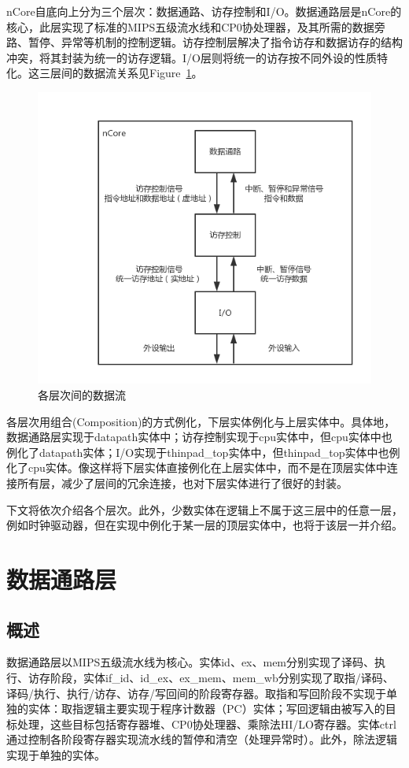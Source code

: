 \documentclass{article}
\begin{document}
\begin{spacing}{1.4}
nCore自底向上分为三个层次：数据通路、访存控制和I/O。数据通路层是nCore的核心，此层实现了标准的MIPS五级流水线和CP0协处理器，及其所需的数据旁路、暂停、异常等机制的控制逻辑。访存控制层解决了指令访存和数据访存的结构冲突，将其封装为统一的访存逻辑。I/O层则将统一的访存按不同外设的性质特化。这三层间的数据流关系见Figure~\ref{fig:layer-data-flow}。

\begin{figure}[!htb]
	\centering
	\includegraphics[width=.7\textwidth]{layer-data-flow.png}
	\caption{各层次间的数据流}
    \label{fig:layer-data-flow}
\end{figure}

各层次用组合(Composition)的方式例化，下层实体例化与上层实体中。具体地，数据通路层实现于datapath实体中；访存控制实现于cpu实体中，但cpu实体中也例化了datapath实体；I/O实现于thinpad\_top实体中，但thinpad\_top实体中也例化了cpu实体。像这样将下层实体直接例化在上层实体中，而不是在顶层实体中连接所有层，减少了层间的冗余连接，也对下层实体进行了很好的封装。

下文将依次介绍各个层次。此外，少数实体在逻辑上不属于这三层中的任意一层，例如时钟驱动器，但在实现中例化于某一层的顶层实体中，也将于该层一并介绍。

\section{数据通路层}

\subsection{概述}

数据通路层以MIPS五级流水线为核心。实体id、ex、mem分别实现了译码、执行、访存阶段，实体if\_id、id\_ex、ex\_mem、mem\_wb分别实现了取指/译码、译码/执行、执行/访存、访存/写回间的阶段寄存器。取指和写回阶段不实现于单独的实体：取指逻辑主要实现于程序计数器（PC）实体；写回逻辑由被写入的目标处理，这些目标包括寄存器堆、CP0协处理器、乘除法HI/LO寄存器。实体ctrl通过控制各阶段寄存器实现流水线的暂停和清空（处理异常时）。此外，除法逻辑实现于单独的实体。


\end{spacing}
\end{document}
